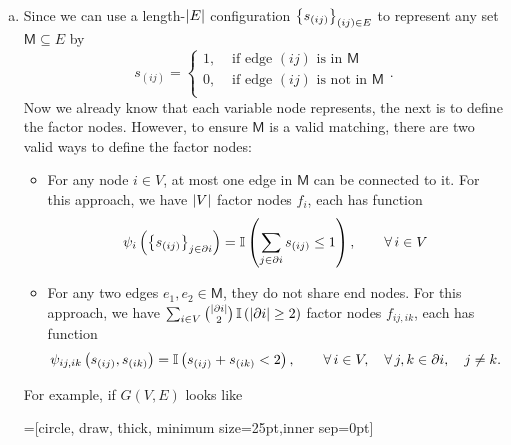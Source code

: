 \documentclass[a4paper,oneside,12pt]{article}
\begin{document}
\begin{solution} $\,$ 
\begin{enumerate}[(a)]
\item 
        Since we can use a length-$ \left| E \right| $ configuration $ \left\lbrace  s_{(ij)}  \right\rbrace_{(ij) \in E} $ to represent any set $ \mathsf{M} \subseteq E $ by
        \begin{equation*}
            s_{(ij)} = 
            \begin{cases}
                1, &\text{ if edge } (ij) \text{ is in } \mathsf{M}\\
                0, &\text{ if edge } (ij) \text{ is not in } \mathsf{M}\\
            \end{cases}.
        \end{equation*}
        Now we already know that each variable node represents, the next is to define the factor nodes.
        However, to ensure $ \mathsf{M} $ is a valid matching, there are two valid ways to define the factor nodes:
        \begin{itemize}
        \item   For any node $ i \in V $, at most one edge in $ \mathsf{M} $ can be connected to it.
                For this approach, we have $ \left| V \right| $ factor nodes $ f_i $, each has function
                \begin{equation*}
                    \psi_i \left(  \left\lbrace  s_{(ij)}  \right\rbrace_{j \in \partial i}  \right)
                    = \mathbb{I} \left(  \sum_{j \in \partial i} s_{(ij)} \le 1  \right), \qquad \forall\, i \in V
                \end{equation*}
        \item   For any two edges $ e_1, e_2 \in \mathsf{M} $, they do not share end nodes.
                For this approach, we have $ \sum_{i \in V} \binom{\left| \partial i \right|}{2}  \,\mathbb{I} \left(  \left| \partial i \right| \ge 2  \right) $ factor nodes $ f_{ij,ik} $, each has function
                \begin{equation*}
                    \psi_{ij, ik} \left(  s_{(ij)}, s_{(ik)}  \right)
                    = \mathbb{I} \left(  s_{(ij)} + s_{(ik)} < 2  \right), \qquad \forall\, i \in V, \quad \forall\, j, k \in \partial i, \quad j \ne k. 
                \end{equation*}
        \end{itemize}
        For example, if $ G(V,E) $ looks like
        \begin{center}
        =[circle, draw, thick, minimum size=25pt,inner sep=0pt]

\end{center}
\end{enumerate}
\end{solution}
\end{document}
